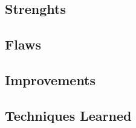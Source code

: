 \documentclass[a4paper,12pt]{article}
\numberwithin{equation}{section} %
\numberwithin{figure}{section}
\begin{document}
\subsection{Strenghts}

\subsection{Flaws}

\subsection{Improvements}

\subsection{Techniques Learned}
\nocite{*} %

\end{document}
